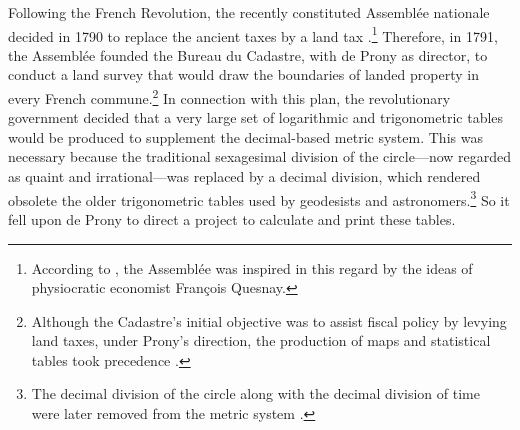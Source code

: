 \documentclass[version=last,draft=false,paper=A4,portrait,twoside=true,twocolumn=false,headinclude=false,footinclude=false,fontsize=12,BCOR=20mm,DIV=calc,pagesize=auto,titlepage=firstiscover,mpinclude=false,open=right,chapterprefix=true,numbers=autoendperiod,headsepline=false,headings=twolinechapter,parskip=false]{scrbook}
\begin{document}
Following the French Revolution, the recently constituted Assemblée
nationale decided in 1790 to replace the ancient taxes by a land tax
\autocite[6]{peaucelle2012a}.\footnote{According to \textcite{peaucelle2012a}, the Assemblée was inspired in
this regard by the ideas of physiocratic economist François Quesnay.} Therefore, in 1791, the Assemblée
founded the Bureau du Cadastre, with de Prony as director, to conduct a
land survey that would draw the boundaries of landed property in every
French commune.\footnote{Although the Cadastre's initial objective was to assist fiscal
policy by levying land taxes, under Prony's direction, the production of
maps and statistical tables took precedence \autocite[76]{peaucelle2012a}.} In connection with this plan, the revolutionary
government decided that a very large set of logarithmic and trigonometric
tables would be produced to supplement the decimal-based metric system.
This was necessary because the traditional sexagesimal division of the
circle---now regarded as quaint and irrational---was replaced by a decimal
division, which rendered obsolete the older trigonometric tables used by
geodesists and astronomers.\footnote{The decimal division of the circle along with the decimal division
of time were later removed from the metric system \autocite[184]{daston1994}.} So it fell upon de Prony to direct a
project to calculate and print these tables.
\end{document}
